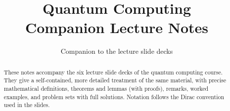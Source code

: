 \documentclass[11pt]{report}
\title{\textbf{Quantum Computing}\\[0.3em]\large Companion Lecture Notes}
\author{Companion to the lecture slide decks}
\date{}
\begin{document}
\maketitle

\begin{abstract}
\noindent These notes accompany the six lecture slide decks of the quantum
computing course. They give a self-contained, more detailed treatment of the
same material, with precise mathematical definitions, theorems and lemmas
(with proofs), remarks, worked examples, and problem sets with full solutions.
Notation follows the Dirac convention used in the slides.
\end{abstract}

\tableofcontents







\end{document}
